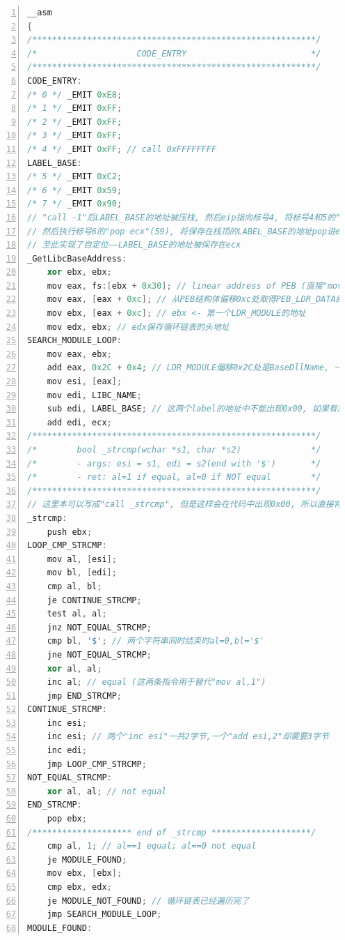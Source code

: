 \documentclass[bachelor]{thesis-uestc}
\begin{document}
\begin{lstlisting}[language=C++, basicstyle=\ttfamily\tiny, numbers=left, numberstyle=\tiny, keywordstyle=\color{blue!70}, commentstyle=\color{red!50!green!50!blue!50}, frame=shadowbox, rulesepcolor=\color{red!20!green!20!blue!20}]
__asm
{
/*********************************************************/
/*                    CODE_ENTRY                         */
/*********************************************************/
CODE_ENTRY:
/* 0 */	_EMIT 0xE8;
/* 1 */	_EMIT 0xFF;
/* 2 */	_EMIT 0xFF;
/* 3 */	_EMIT 0xFF;
/* 4 */	_EMIT 0xFF; // call 0xFFFFFFFF
LABEL_BASE:
/* 5 */	_EMIT 0xC2;
/* 6 */	_EMIT 0x59;
/* 7 */	_EMIT 0x90;
// "call -1"后LABEL_BASE的地址被压栈, 然后eip指向标号4, 将标号4和5的"FFC2"译码成"inc edx";
// 然后执行标号6的"pop ecx"(59), 将保存在栈顶的LABEL_BASE的地址pop进ecx; 之后执行标号7的"nop"(90).
// 至此实现了自定位——LABEL_BASE的地址被保存在ecx
_GetLibcBaseAddress:
	xor ebx, ebx;
	mov eax, fs:[ebx + 0x30]; // linear address of PEB (直接"mov eax,fs:[0x30]"会使代码中出现0x00)
	mov eax, [eax + 0xc]; // 从PEB结构体偏移0xc处取得PEB_LDR_DATA结构体的地址
	mov ebx, [eax + 0xc]; // ebx <- 第一个LDR_MODULE的地址
	mov edx, ebx; // edx保存循环链表的头地址
SEARCH_MODULE_LOOP:
	mov eax, ebx;
	add eax, 0x2C + 0x4; // LDR_MODULE偏移0x2C处是BaseDllName, 一个UNICODE_STRING, 其中偏移0x4处是一个指向UNICODE字符串的指针
	mov esi, [eax];
	mov edi, LIBC_NAME;
	sub edi, LABEL_BASE; // 这两个label的地址中不能出现0x00, 如果有就重新编译知道满足要求
	add edi, ecx;
/*********************************************************/
/*        bool _strcmp(wchar *s1, char *s2)              */
/*        - args: esi = s1, edi = s2(end with '$')       */
/*        - ret: al=1 if equal, al=0 if NOT equal        */
/*********************************************************/
// 这里本可以写成"call _strcmp", 但是这样会在代码中出现0x00, 所以直接将函数嵌入进来
_strcmp:
	push ebx;
LOOP_CMP_STRCMP:
	mov al, [esi];
	mov bl, [edi];
	cmp al, bl;
	je CONTINUE_STRCMP;
	test al, al;
	jnz NOT_EQUAL_STRCMP;
	cmp bl, '$'; // 两个字符串同时结束时al=0,bl='$'
	jne NOT_EQUAL_STRCMP;
	xor al, al;
	inc al; // equal (这两条指令用于替代"mov al,1")
	jmp END_STRCMP;
CONTINUE_STRCMP:
	inc esi;
	inc esi; // 两个"inc esi"一共2字节,一个"add esi,2"却需要3字节
	inc edi;
	jmp LOOP_CMP_STRCMP;
NOT_EQUAL_STRCMP:
	xor al, al; // not equal
END_STRCMP:
	pop ebx;
/******************** end of _strcmp ********************/
	cmp al, 1; // al==1 equal; al==0 not equal
	je MODULE_FOUND;
	mov ebx, [ebx];
	cmp ebx, edx;
	je MODULE_NOT_FOUND; // 循环链表已经遍历完了
	jmp SEARCH_MODULE_LOOP;
MODULE_FOUND:

\end{lstlisting}
\end{document}
